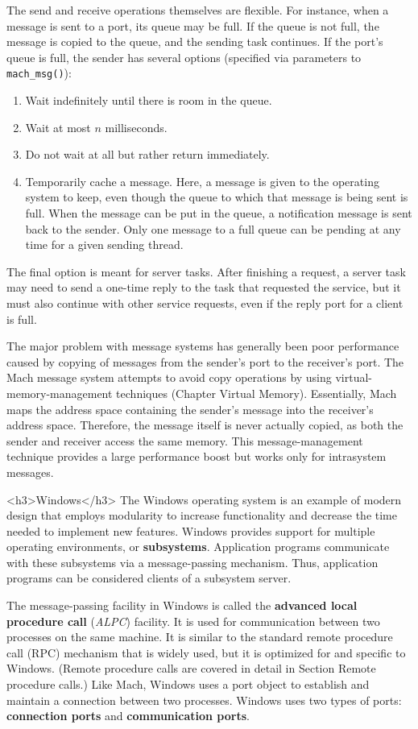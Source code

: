 The send and receive operations themselves are flexible. For instance, when a message is sent to a port, its queue may be full. If the queue is not full, the message is copied to the queue, and the sending task continues. If the port's queue is full, the sender has several options (specified via parameters to \texttt{mach\_msg()}):
\begin{enumerate}
\item Wait indefinitely until there is room in the queue.
\item Wait at most $n$ milliseconds.
\item Do not wait at all but rather return immediately.
\item Temporarily cache a message. Here, a message is given to the operating system to keep, even though the queue to which that message is being sent is full. When the message can be put in the queue, a notification message is sent back to the sender. Only one message to a full queue can be pending at any time for a given sending thread.
\end{enumerate}
The final option is meant for server tasks. After finishing a request, a server task may need to send a one-time reply to the task that requested the service, but it must also continue with other service requests, even if the reply port for a client is full.

The major problem with message systems has generally been poor performance caused by copying of messages from the sender's port to the receiver's port. The Mach message system attempts to avoid copy operations by using virtual-memory-management techniques (Chapter Virtual Memory). Essentially, Mach maps the address space containing the sender's message into the receiver's address space. Therefore, the message itself is never actually copied, as both the sender and receiver access the same memory. This message-management technique provides a large performance boost but works only for intrasystem messages.

<h3>Windows</h3>
The Windows operating system is an example of modern design that employs modularity to increase functionality and decrease the time needed to implement new features. Windows provides support for multiple operating environments, or \textbf{subsystems}. Application programs communicate with these subsystems via a message-passing mechanism. Thus, application programs can be considered clients of a subsystem server.

The message-passing facility in Windows is called the \textbf{advanced local procedure call} (\textit{ALPC}) facility. It is used for communication between two processes on the same machine. It is similar to the standard remote procedure call (RPC) mechanism that is widely used, but it is optimized for and specific to Windows. (Remote procedure calls are covered in detail in Section Remote procedure calls.) Like Mach, Windows uses a port object to establish and maintain a connection between two processes. Windows uses two types of ports: \textbf{connection ports} and \textbf{communication ports}.

